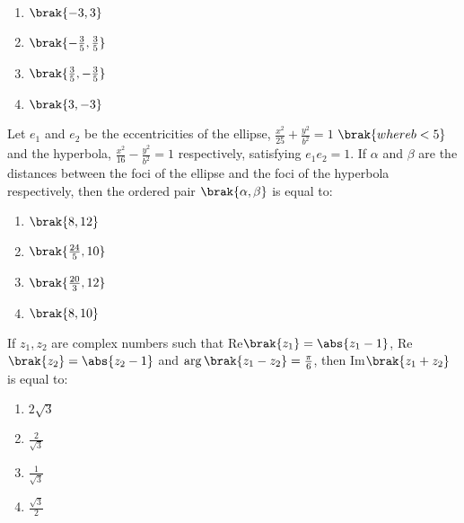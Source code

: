           \begin{multicols}{4}

\begin{enumerate}
    \item $\brak{-3, 3}$
    \item $\brak{-\frac{3}{5}, \frac{3}{5}}$
    \item $\brak{\frac{3}{5}, -\frac{3}{5}}$
    \item $\brak{3, -3}$
\end{enumerate}
\end{multicols}

\item  Let $e_1$ and $e_2$ be the eccentricities of the ellipse, $\frac{x^2}{25} + \frac{y^2}{b^2} = 1$ $\brak{where b < 5}$ and the hyperbola, $\frac{x^2}{16} - \frac{y^2}{b^2} = 1$ respectively, satisfying $e_1 e_2 = 1$. If $\alpha$ and $\beta$ are the distances between the foci of the ellipse and the foci of the hyperbola respectively, then the ordered pair $\brak{\alpha, \beta}$ is equal to:  \hfill {}

          \begin{multicols}{4}

\begin{enumerate}
    \item $\brak{8, 12}$
    \item $\brak{\frac{24}{5}, 10}$
    \item $\brak{\frac{20}{3}, 12}$
    \item $\brak{8, 10}$
\end{enumerate}
\end{multicols}

\item If $z_1, z_2$ are complex numbers such that Re$\brak{z_1} = \abs{z_1 - 1}$, Re$\brak{z_2} = \abs{z_2 - 1}$ and $\arg\brak{z_1 - z_2} = \frac{\pi}{6}$, then Im$\brak{z_1 + z_2}$ is equal to: \hfill {}

        \begin{multicols}{4}

\begin{enumerate}
    \item $2\sqrt{3}$
    \item $\frac{2}{\sqrt{3}}$
    \item $\frac{1}{\sqrt{3}}$
    \item $\frac{\sqrt{3}}{2}$
\end{enumerate}
\end{multicols}

